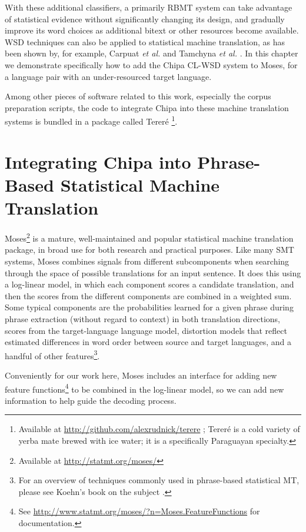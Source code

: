 With these additional classifiers, a primarily RBMT system can take advantage
of statistical evidence without significantly changing its design, and
gradually improve its word choices as additional bitext or other resources
become available.
WSD techniques can also be applied to statistical machine translation, as has
been shown by, for example, Carpuat \emph{et al.} \cite{carpuatpsd} and
Tamchyna \emph{et al.} \cite{tamchyna2014integrating}. In this chapter we
demonstrate specifically how to add the Chipa CL-WSD system to Moses, for a
language pair with an under-resourced target language.

Among other pieces of software related to this work, especially the corpus
preparation scripts, the code to integrate Chipa into these machine translation
systems is bundled in a package called Tereré \footnote{Available at
\url{http://github.com/alexrudnick/terere} ; Tereré is a cold variety of yerba
mate brewed with ice water; it is a specifically Paraguayan specialty.}.

\section{Integrating Chipa into Phrase-Based Statistical Machine Translation}
Moses\footnote{Available at \url{http://statmt.org/moses/}} is a mature,
well-maintained and popular statistical machine translation package, in broad
use for both research and practical purposes.
Like many SMT systems, Moses combines signals from different subcomponents when
searching through the space of possible translations for an input sentence. It
does this using a log-linear model, in which each component scores a candidate
translation, and then the scores from the different components are combined in
a weighted sum. Some typical components are the probabilities learned for a
given phrase during phrase extraction (without regard to context) in both
translation directions, scores from the target-language language model,
distortion models that reflect estimated differences in word order between
source and target languages, and a handful of other features\footnote{For an
overview of techniques commonly used in phrase-based statistical MT, please see
Koehn's book on the subject \cite{koehn2010statistical}.}.

Conveniently for our work here, Moses includes an interface for adding new
feature functions\footnote{See
\url{http://www.statmt.org/moses/?n=Moses.FeatureFunctions} for documentation.}
to be combined in the log-linear model, so we can add new information to help
guide the decoding process.

